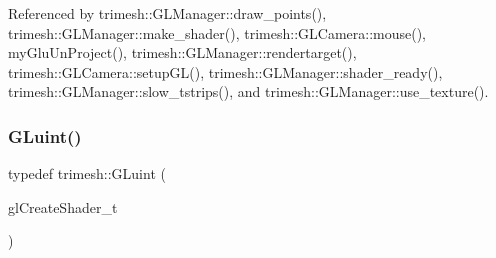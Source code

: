Referenced by trimesh\+::\+G\+L\+Manager\+::draw\+\_\+points(), trimesh\+::\+G\+L\+Manager\+::make\+\_\+shader(), trimesh\+::\+G\+L\+Camera\+::mouse(), my\+Glu\+Un\+Project(), trimesh\+::\+G\+L\+Manager\+::rendertarget(), trimesh\+::\+G\+L\+Camera\+::setup\+G\+L(), trimesh\+::\+G\+L\+Manager\+::shader\+\_\+ready(), trimesh\+::\+G\+L\+Manager\+::slow\+\_\+tstrips(), and trimesh\+::\+G\+L\+Manager\+::use\+\_\+texture().

\mbox{\label{namespacetrimesh_ad2289423ef47b393854afc30451d433b}} 
\subsubsection{\texorpdfstring{G\+Luint()}{GLuint()}}
{\footnotesize\ttfamily typedef trimesh\+::\+G\+Luint (\begin{DoxyParamCaption}\item[{\hyperlink{GLManager_8cc_aef0d9e5e275e1b7becf54b6aa9ce3911}{A\+P\+I\+E\+N\+T\+R\+YP}}]{gl\+Create\+Shader\+\_\+t }\end{DoxyParamCaption})}

\mbox{\label{namespacetrimesh_a0998a81f51d7ca84060748ea68c52e04}} 
